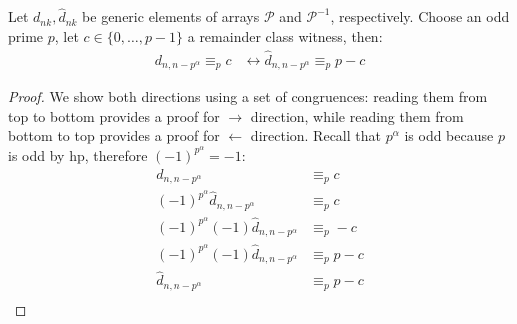 \begin{theorem}
    Let $d_{nk}, \hat{d}_{nk}$ be generic elements of arrays $\mathcal{P}$ and $\mathcal{P}^{-1}$,
    respectively. Choose an odd prime $p$, let $c\in \lbrace 0, \ldots, p-1 \rbrace$ a remainder class
    witness, then:
    \begin{displaymath}
        \begin{split}
            d_{n,n-p^{\alpha}} \equiv_{p} c &\leftrightarrow \hat{d}_{n,n-p^{\alpha}} \equiv_{p} p-c
        \end{split}
    \end{displaymath}
\end{theorem}
\begin{proof}
We show both directions using a set of congruences: reading them from top to bottom provides a 
proof for $\rightarrow$ direction, while reading them from bottom to top provides a proof for 
$\leftarrow$ direction. Recall that $p^\alpha$ is odd because $p$ is odd by hp, therefore $(-1)^{p^\alpha} = -1$:
\begin{displaymath}
    \begin{split}
        d_{n,n-p^{\alpha}} &\equiv_{p} c \\
        (-1)^{p^\alpha}\hat{d}_{n,n-p^{\alpha}} &\equiv_{p} c \\
        (-1)^{p^\alpha }(-1)\hat{d}_{n,n-p^{\alpha}} &\equiv_{p} -c \\
        (-1)^{p^\alpha }(-1)\hat{d}_{n,n-p^{\alpha}} &\equiv_{p} p -c \\
        \hat{d}_{n,n-p^{\alpha}} &\equiv_{p} p -c \\
    \end{split}
\end{displaymath}
\end{proof}
